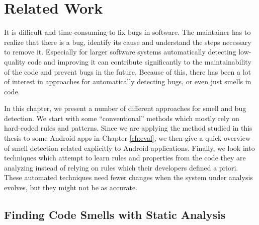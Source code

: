 \chapter{Related Work}\label{ch:relWork}




It is difficult and time-consuming to fix bugs in software.
The maintainer has to realize that there is a bug, identify its cause and understand the steps necessary to remove it.
Especially for larger software systems automatically detecting low-quality code and improving it can contribute significantly to the maintainability of the code and prevent bugs in the future.
Because of this, there has been a lot of interest in approaches for automatically detecting bugs, or even just smells in code.

In this chapter, we present a number of different approaches for smell and bug detection.
We start with some ``conventional'' methods which mostly rely on hard-coded rules and patterns.
Since we are applying the method studied in this thesis to some Android apps in Chapter \ref{ch:eval}, we then give a quick overview of smell detection related explicitly to Android applications.
Finally, we look into techniques which attempt to learn rules and properties from the code they are analyzing instead of relying on rules which their developers defined a priori.
These automated techniques need fewer changes when the system under analysis evolves, but they might not be as accurate.

\section{Finding Code Smells with Static Analysis}

